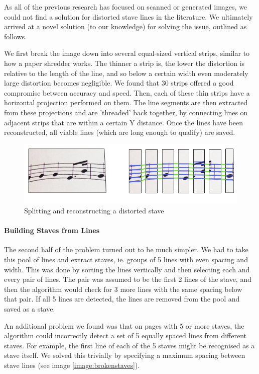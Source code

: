 As all of the previous research has focused on scanned or generated images, we could not find a solution for distorted stave lines in the literature. We ultimately arrived at a novel solution (to our knowledge) for solving the issue, outlined as follows.

We first break the image down into several equal-sized vertical strips, similar to how a paper shredder works. The thinner a strip is, the lower the distortion is relative to the length of the line, and so below a certain width even moderately large distortion becomes negligible. We found that 30 strips offered a good compromise between accuracy and speed. Then, each of these thin strips have a horizontal projection performed on them. The line segments are
then extracted from these projections and are 'threaded' back together, by connecting lines on adjacent strips that are within a certain Y distance. Once the lines have been reconstructed, all viable lines (which are long enough to qualify) are saved.

\begin{figure}[h!]
    \centering
    \includegraphics[width=120mm]{./assets/building_lines.png}
    \caption{Splitting and reconstructing a distorted stave}
    \label{image:linesjoining}
\end{figure}

\paragraph{Building Staves from Lines}

The second half of the problem turned out to be much simpler. We had to take this pool of lines and extract staves, ie. groups of 5 lines with even spacing and width. This was done by sorting the lines vertically and then selecting each and every pair of lines. The pair was assumed to be the first 2 lines of the stave, and then the algorithm would check for 3 more lines with the same spacing below that pair. If all 5 lines are detected, the lines
are removed from the pool and saved as a stave.

An additional problem we found was that on pages with 5 or more staves, the algorithm could incorrectly detect a set of 5 equally spaced lines from different staves. For example, the first line of each of the 5 staves might be recognised as a stave itself. We solved this trivially by specifying a maximum spacing between stave lines (see image \ref{image:brokenstaves}).

